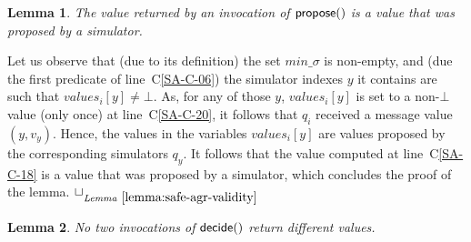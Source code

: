 \documentclass[11pt,letterpaper]{article}
\newtheorem{lemma}{Lemma}
\newlength {\afterproof}
\newcommand{\toto}{xxx}
\newenvironment{proofL}{\noindent{\bf Proof }}
{\hspace*{\fill}$\Box_{\mathit{Lemma}~\ref{\toto}}$\par\vspace{\afterproof}}
\begin{document}
\begin{lemma}
\label{lemma:safe-agr-validity}
The value returned by an invocation of ${\sf propose}()$ is a value
that was  proposed by a simulator.
\end{lemma}

\begin{proofL}
Let us observe that (due to its definition) the  set $min\_\sigma$
is non-empty, and (due the first predicate of line~C\ref{SA-C-06})
the simulator indexes $y$ it contains are such that $values_i[y]\neq\bot$.
As, for any of those $y$,  $values_i[y]$ is set to a non-$\bot$ value (only
once) at line~C\ref{SA-C-20}, it follows that $q_i$ received a message
{\sc value} $(y,v_y)$. Hence, the values in the  variables  $values_i[y]$
are values proposed by the corresponding simulators $q_y$.
It follows that the value computed at line~C\ref{SA-C-18} is a value that
was proposed by a simulator, which concludes the proof of the lemma.
\renewcommand{\toto}{lemma:safe-agr-validity}
\end{proofL}

\begin{lemma}
\label{lemma:safe-agr-agreement}
No two invocations of ${\sf decide}()$ return different values.
\end{lemma}
\end{document}
